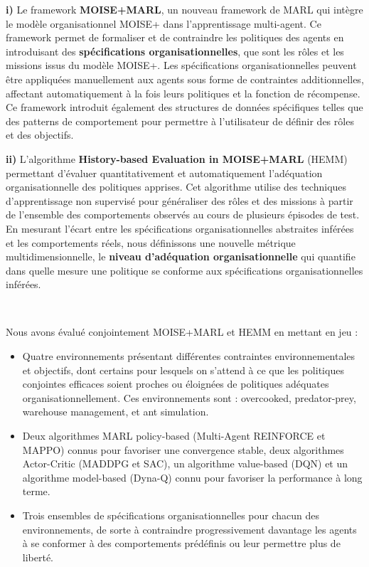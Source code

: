 \documentclass[sigconf,anonymous]{aamas}
\begin{document}
\quad \textbf{i)} Le framework \textbf{MOISE+MARL}, un nouveau framework de MARL qui intègre le modèle organisationnel MOISE+ dans l'apprentissage multi-agent. Ce framework permet de formaliser et de contraindre les politiques des agents en introduisant des \textbf{spécifications organisationnelles}, que sont les rôles et les missions issus du modèle MOISE+. Les spécifications organisationnelles peuvent être appliquées manuellement aux agents sous forme de contraintes additionnelles, affectant automatiquement à la fois leurs politiques et la fonction de récompense. Ce framework introduit également des structures de données spécifiques telles que des patterns de comportement pour permettre à l'utilisateur de définir des rôles et des objectifs.

\quad \textbf{ii)} L'algorithme \textbf{History-based Evaluation in MOISE+MARL} (HEMM) permettant d'évaluer quantitativement et automatiquement l'adéquation organisationnelle des politiques apprises. Cet algorithme utilise des techniques d'apprentissage non supervisé pour généraliser des rôles et des missions à partir de l'ensemble des comportements observés au cours de plusieurs épisodes de test. En mesurant l'écart entre les spécifications organisationnelles abstraites inférées et les comportements réels, nous définissons une nouvelle métrique multidimensionnelle, le \textbf{niveau d'adéquation organisationnelle} qui quantifie dans quelle mesure une politique se conforme aux spécifications organisationnelles inférées.

\

\noindent Nous avons évalué conjointement MOISE+MARL et HEMM en mettant en jeu :
\begin{itemize}
  \item Quatre environnements présentant différentes contraintes environnementales et objectifs, dont certains pour lesquels on s'attend à ce que les politiques conjointes efficaces soient proches ou éloignées de politiques adéquates organisationnellement. Ces environnements sont : overcooked, predator-prey, warehouse management, et ant simulation.
  \item Deux algorithmes MARL policy-based (Multi-Agent REINFORCE et MAPPO) connus pour favoriser une convergence stable, deux algorithmes Actor-Critic (MADDPG et SAC), un algorithme value-based (DQN) et un algorithme model-based (Dyna-Q) connu pour favoriser la performance à long terme.
  \item Trois ensembles de spécifications organisationnelles pour chacun des environnements, de sorte à contraindre progressivement davantage les agents à se conformer à des comportements prédéfinis ou leur permettre plus de liberté.
\end{itemize}
\end{document}
